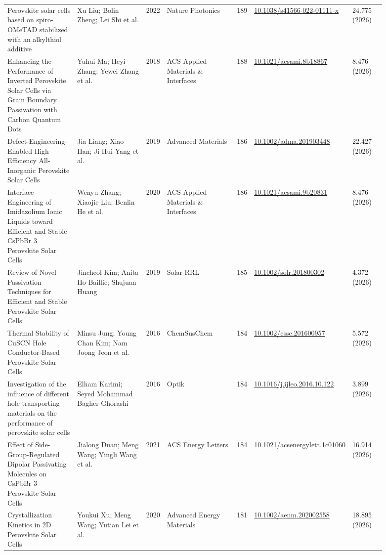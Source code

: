 \documentclass[10pt,a4paper]{article}
\begin{document}
{\begin{longtable}{p{0.197\linewidth}p{0.197\linewidth}p{0.043\linewidth}p{0.197\linewidth}p{0.043\linewidth}p{0.117\linewidth}p{0.098\linewidth}}
Perovskite solar cells based on spiro-OMeTAD stabilized with an alkylthiol additive & Xu Liu; Bolin Zheng; Lei Shi et al. & 2022 & Nature Photonics & 189 & \href{https://doi.org/10.1038/s41566-022-01111-x}{10.1038/s41566-022-01111-x} & 24.775 (2026) \\
Enhancing the Performance of Inverted Perovskite Solar Cells via Grain Boundary Passivation with Carbon Quantum Dots & Yuhui Ma; Heyi Zhang; Yewei Zhang et al. & 2018 & ACS Applied Materials \& Interfaces & 188 & \href{https://doi.org/10.1021/acsami.8b18867}{10.1021/acsami.8b18867} & 8.476 (2026) \\
Defect‐Engineering‐Enabled High‐Efficiency All‐Inorganic Perovskite Solar Cells & Jia Liang; Xiao Han; Ji‐Hui Yang et al. & 2019 & Advanced Materials & 186 & \href{https://doi.org/10.1002/adma.201903448}{10.1002/adma.201903448} & 22.427 (2026) \\
Interface Engineering of Imidazolium Ionic Liquids toward Efficient and Stable CsPbBr 3 Perovskite Solar Cells & Wenyu Zhang; Xiaojie Liu; Benlin He et al. & 2020 & ACS Applied Materials \& Interfaces & 186 & \href{https://doi.org/10.1021/acsami.9b20831}{10.1021/acsami.9b20831} & 8.476 (2026) \\
Review of Novel Passivation Techniques for Efficient and Stable Perovskite Solar Cells & Jincheol Kim; Anita Ho‐Baillie; Shujuan Huang & 2019 & Solar RRL & 185 & \href{https://doi.org/10.1002/solr.201800302}{10.1002/solr.201800302} & 4.372 (2026) \\
Thermal Stability of CuSCN Hole Conductor‐Based Perovskite Solar Cells & Minsu Jung; Young Chan Kim; Nam Joong Jeon et al. & 2016 & ChemSusChem & 184 & \href{https://doi.org/10.1002/cssc.201600957}{10.1002/cssc.201600957} & 5.572 (2026) \\
Investigation of the influence of different hole-transporting materials on the performance of perovskite solar cells & Elham Karimi; Seyed Mohammad Bagher Ghorashi & 2016 & Optik & 184 & \href{https://doi.org/10.1016/j.ijleo.2016.10.122}{10.1016/j.ijleo.2016.10.122} & 3.899 (2026) \\
Effect of Side-Group-Regulated Dipolar Passivating Molecules on CsPbBr 3 Perovskite Solar Cells & Jialong Duan; Meng Wang; Yingli Wang et al. & 2021 & ACS Energy Letters & 184 & \href{https://doi.org/10.1021/acsenergylett.1c01060}{10.1021/acsenergylett.1c01060} & 16.914 (2026) \\
Crystallization Kinetics in 2D Perovskite Solar Cells & Youkui Xu; Meng Wang; Yutian Lei et al. & 2020 & Advanced Energy Materials & 181 & \href{https://doi.org/10.1002/aenm.202002558}{10.1002/aenm.202002558} & 18.895 (2026) \\

\end{longtable}}
\end{document}
